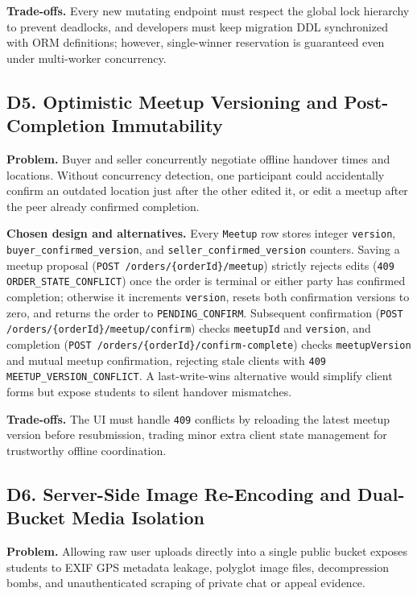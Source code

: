 \textbf{Trade-offs.} Every new mutating endpoint must respect the global lock hierarchy to prevent deadlocks, and developers must keep migration DDL synchronized with ORM definitions; however, single-winner reservation is guaranteed even under multi-worker concurrency.

\subsection{D5. Optimistic Meetup Versioning and Post-Completion Immutability}

\textbf{Problem.} Buyer and seller concurrently negotiate offline handover times and locations. Without concurrency detection, one participant could accidentally confirm an outdated location just after the other edited it, or edit a meetup after the peer already confirmed completion.

\textbf{Chosen design and alternatives.} Every \texttt{Meetup} row stores integer \texttt{version}, \texttt{buyer\_confirmed\_version}, and \texttt{seller\_confirmed\_version} counters. Saving a meetup proposal (\texttt{POST /orders/\{orderId\}/meetup}) strictly rejects edits (\texttt{409 ORDER\_STATE\_CONFLICT}) once the order is terminal or either party has confirmed completion; otherwise it increments \texttt{version}, resets both confirmation versions to zero, and returns the order to \texttt{PENDING\_CONFIRM}. Subsequent confirmation (\texttt{POST /orders/\{orderId\}/meetup/confirm}) checks \texttt{meetupId} and \texttt{version}, and completion (\texttt{POST /orders/\{orderId\}/confirm-complete}) checks \texttt{meetupVersion} and mutual meetup confirmation, rejecting stale clients with \texttt{409 MEETUP\_VERSION\_CONFLICT}. A last-write-wins alternative would simplify client forms but expose students to silent handover mismatches.

\textbf{Trade-offs.} The UI must handle \texttt{409} conflicts by reloading the latest meetup version before resubmission, trading minor extra client state management for trustworthy offline coordination.

\subsection{D6. Server-Side Image Re-Encoding and Dual-Bucket Media Isolation}

\textbf{Problem.} Allowing raw user uploads directly into a single public bucket exposes students to EXIF GPS metadata leakage, polyglot image files, decompression bombs, and unauthenticated scraping of private chat or appeal evidence.

